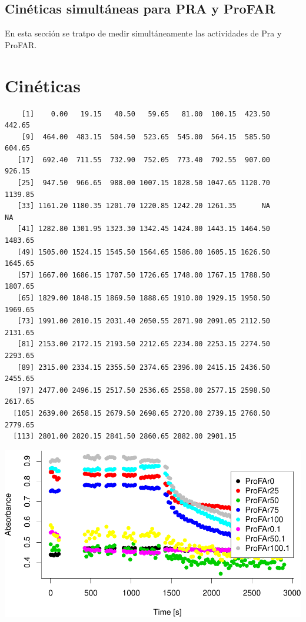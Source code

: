 \documentclass[12pt,twoside]{reedthesis}
\begin{document}
{  \clearpage 
  
  \subsection{Cinéticas simultáneas para PRA y
  ProFAR}\label{cineticas-simultaneas-para-pra-y-profar}
  
  En esta sección se tratpo de medir simultáneamente las actividades de
  Pra y ProFAR.
  
  \section{Cinéticas}\label{cineticas}
  
  \begin{verbatim}
    [1]    0.00   19.15   40.50   59.65   81.00  100.15  423.50  442.65
    [9]  464.00  483.15  504.50  523.65  545.00  564.15  585.50  604.65
   [17]  692.40  711.55  732.90  752.05  773.40  792.55  907.00  926.15
   [25]  947.50  966.65  988.00 1007.15 1028.50 1047.65 1120.70 1139.85
   [33] 1161.20 1180.35 1201.70 1220.85 1242.20 1261.35      NA      NA
   [41] 1282.80 1301.95 1323.30 1342.45 1424.00 1443.15 1464.50 1483.65
   [49] 1505.00 1524.15 1545.50 1564.65 1586.00 1605.15 1626.50 1645.65
   [57] 1667.00 1686.15 1707.50 1726.65 1748.00 1767.15 1788.50 1807.65
   [65] 1829.00 1848.15 1869.50 1888.65 1910.00 1929.15 1950.50 1969.65
   [73] 1991.00 2010.15 2031.40 2050.55 2071.90 2091.05 2112.50 2131.65
   [81] 2153.00 2172.15 2193.50 2212.65 2234.00 2253.15 2274.50 2293.65
   [89] 2315.00 2334.15 2355.50 2374.65 2396.00 2415.15 2436.50 2455.65
   [97] 2477.00 2496.15 2517.50 2536.65 2558.00 2577.15 2598.50 2617.65
  [105] 2639.00 2658.15 2679.50 2698.65 2720.00 2739.15 2760.50 2779.65
  [113] 2801.00 2820.15 2841.50 2860.65 2882.00 2901.15
  \end{verbatim}
  
  \begin{center}\includegraphics{tesis_files/figure-latex/Cinetics-1} \end{center}
  
}
\end{document}
